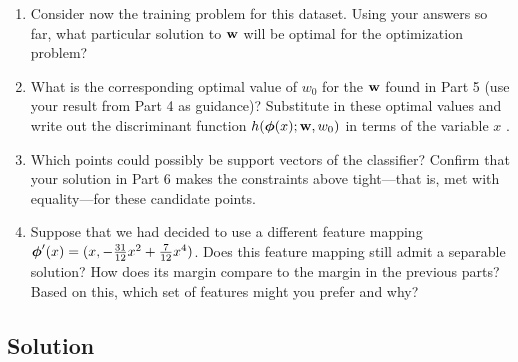 \documentclass[submit]{harvardml}
\begin{document}
\begin{problem}
\begin{enumerate}
\item Consider now the training problem for this dataset. Using your
  answers so far, what particular solution to $\mathbf{w}$ will be optimal
  for the optimization problem?

\item What is the corresponding optimal value of $w_0$ for the
  $\mathbf{w}$ found in Part 5 (use your result from Part 4 as guidance)?
  Substitute in these optimal values and write out the discriminant
  function $h(\boldsymbol{\phi}(x);\mathbf{w},w_0)$ in terms of the variable $x$ .


\item Which points could possibly be support vectors of the classifier?  Confirm that
  your solution in Part 6 makes the constraints above tight---that is,
  met with equality---for these candidate points.

\item Suppose that we had decided to use a different feature mapping
    $\boldsymbol{\phi}'(x) = (x, -\frac{31}{12}x^2 + \frac{7}{12}x^4 )$.  Does
    this feature mapping still admit a separable solution?  How does
    its margin compare to the margin in the previous parts?  Based on
    this, which set of features might you prefer and why? 
    
\end{enumerate}

\end{problem}

\subsection*{Solution}


\end{document}
